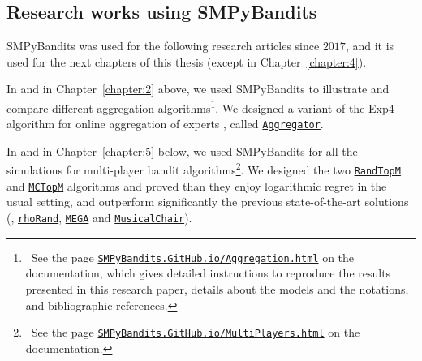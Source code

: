\subsection{Research works using SMPyBandits}

SMPyBandits was used for the following research articles since $2017$, and it is used for the next chapters of this thesis (except in Chapter~\ref{chapter:4}).

In \cite{Besson2018WCNC} and in Chapter~\ref{chapter:2} above, we used SMPyBandits to illustrate and compare different aggregation algorithms\footnote{~See the page \texttt{\href{https://SMPyBandits.GitHub.io/Aggregation.html}{SMPyBandits.GitHub.io/Aggregation.html}} on the documentation, which gives detailed instructions to reproduce the results presented in this research paper, details about the models and the notations, and bibliographic references.}. We designed a variant of the Exp4 algorithm for online aggregation of experts \cite{Bubeck12}, called \texttt{\href{https://SMPyBandits.GitHub.io/docs/Policies.Aggregator.html}{Aggregator}}.

In \cite{Besson2018ALT} and in Chapter~\ref{chapter:5} below, we used SMPyBandits for all the simulations for multi-player bandit algorithms\footnote{~See the page \texttt{\href{https://SMPyBandits.GitHub.io/MultiPlayers.html}{SMPyBandits.GitHub.io/MultiPlayers.html}} on the documentation.}. We designed the two \texttt{\href{https://SMPyBandits.GitHub.io/docs/PoliciesMultiPlayers.RandTopM.html}{RandTopM}} and \texttt{\href{https://SMPyBandits.GitHub.io/docs/PoliciesMultiPlayers.MCTopM.html}{MCTopM}} algorithms and proved than they enjoy logarithmic regret in the usual setting, and outperform significantly the previous state-of-the-art solutions (\ie, \texttt{\href{https://SMPyBandits.GitHub.io/docs/PoliciesMultiPlayers.rhoRand.html}{rhoRand}}, \texttt{\href{https://SMPyBandits.GitHub.io/docs/Policies.MEGA.html}{MEGA}} and \texttt{\href{https://SMPyBandits.GitHub.io/docs/Policies.MusicalChair.html}{MusicalChair}}).

